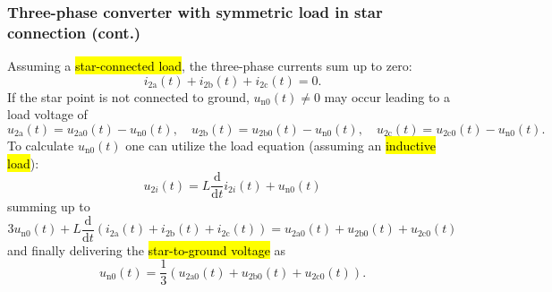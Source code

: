 \begin{frame}
    \frametitle{Three-phase converter with symmetric load in star connection (cont.)}
    Assuming a \hl{star-connected load}, the three-phase currents sum up to zero:
    \begin{equation}
       i_{2\mathrm{a}}(t) + i_{2\mathrm{b}}(t) + i_{2\mathrm{c}}(t) = 0.
       \label{eq:three_phase_current_sum_star}
    \end{equation}\pause
    If the star point is not connected to ground, $u_{\mathrm{n}0}(t)\neq 0$ may occur leading to a load voltage of 
    \begin{equation}
        u_{2\mathrm{a}}(t) = u_{2\mathrm{a}0}(t) - u_{\mathrm{n}0}(t), \quad u_{2\mathrm{b}}(t) = u_{2\mathrm{b}0}(t) - u_{\mathrm{n}0}(t), \quad u_{2\mathrm{c}}(t) = u_{2\mathrm{c}0}(t) - u_{\mathrm{n}0}(t).
    \end{equation}\pause
    To calculate $u_{\mathrm{n}0}(t)$ one can utilize the load equation (assuming an \hl{inductive load}):
    \begin{equation}
        u_{2i}(t) = L \frac{\mathrm{d}}{\mathrm{d}t} i_{2i}(t) + u_{\mathrm{n}0}(t)
    \end{equation}\pause
    summing up to
    \begin{equation}
        3u_{\mathrm{n}0}(t) +  L \frac{\mathrm{d}}{\mathrm{d}t} \left(i_{2\mathrm{a}}(t) + i_{2\mathrm{b}}(t) + i_{2\mathrm{c}}(t)\right) = u_{2\mathrm{a}0}(t) + u_{2\mathrm{b}0}(t) +u_{2\mathrm{c}0}(t)
    \end{equation}\pause
    and finally delivering the \hl{star-to-ground voltage} as 
    \begin{equation}
        u_{\mathrm{n}0}(t) = \frac{1}{3} \left(u_{2\mathrm{a}0}(t) + u_{2\mathrm{b}0}(t) +u_{2\mathrm{c}0}(t)\right).
    \end{equation}
\end{frame}

